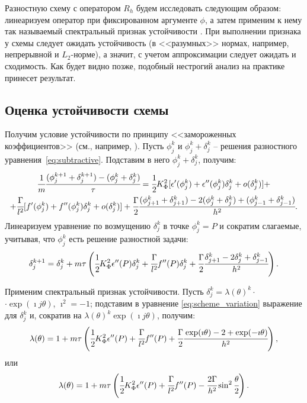 Разностную схему с оператором $R_h$ будем исследовать следующим образом: линеаризуем оператор при фиксированном аргументе $\phi$, а затем применим к нему так называемый спектральный признак устойчивости \cite{bahvalov_computational_methods}. При выполнении признака у схемы следует ожидать устойчивость (в <<разумных>> нормах, например, непрерывной и $L_2$-норме), а значит, с учетом аппроксимации следует ожидать и сходимость. Как будет видно позже, подобный нестрогий анализ на практике принесет результат.


\subsection{Оценка устойчивости схемы}

Получим условие устойчивости по принципу <<замороженных коэффициентов>> (см., например, \cite{bahvalov_computational_methods}). Пусть $\phi_j^k$ и $\phi_j^k + \delta_j^k$ -- решения разностного уравнения~\eqref{eq:subtractive}. Подставим в него $\phi_j^k + \delta_j^k$, получим:
\begin{multline*}
    \cfrac{1}{m} \cfrac{(\phi_j^{k + 1} + \delta_j^{k + 1}) - (\phi_j^k + \delta_j^k)}{\tau} = \cfrac{1}{2} K_\Phi^2 [\epsilon'(\phi_j^k) + \epsilon''(\phi_j^k) \delta_j^k + o(\delta_j^k)] + \\ + \cfrac{\Gamma}{l^2} [f'(\phi_j^k) + f''(\phi_j^k) \delta_j^k + o(\delta_j^k)] + \cfrac{\Gamma}{2} \cfrac{(\phi_{j + 1}^k + \delta_{j + 1}^k) - 2 (\phi_j^k + \delta_j^k) + (\phi_{j - 1}^k + \delta_{j - 1}^k)}{h^2} {\text{.}}
\end{multline*}
Линеаризуем уравнение по возмущению $\delta_j^k$ в точке $\phi_j^k = P$ и сократим слагаемые, учитывая, что $\phi_j^k$ есть решение разностной задачи:
\begin{equation}
    \delta_j^{k + 1} = \delta_j^k + m \tau \left( \cfrac{1}{2} K_\Phi^2 \epsilon''(P) \delta_j^k + \cfrac{\Gamma}{l^2} f''(P) \delta_j^k + \cfrac{\Gamma}{2} \cfrac{{\delta}_{j + 1}^k - 2 {\delta}_j^k + {\delta}_{j - 1}^k}{h^2} \right) {\text{.}}
    \label{eq:scheme_variation}
\end{equation} 

Применим спектральный признак устойчивости. Пусть $\delta_j^k = \lambda(\theta)^k \cdot$ \linebreak $\cdot \exp(\imath j \theta)$, $\imath^2 = -1$; подставим в уравнение \eqref{eq:scheme_variation} выражение для $\delta_j^k$ и, сократив на $\lambda(\theta)^k \exp(\imath j \theta)$, получим:
$$\lambda(\theta) = 1 + m \tau \left( \cfrac{1}{2} K_\Phi^2 \epsilon''(P) + \cfrac{\Gamma}{l^2} f''(P) + \cfrac{\Gamma}{2} \cfrac{\exp(\imath \theta) - 2 + \exp(-\imath \theta)}{h^2} \right) {\text{,}}$$
или
\begin{equation}
    \lambda(\theta) = 1 + m \tau \left( \cfrac{1}{2} K_\Phi^2 \epsilon''(P) + \cfrac{\Gamma}{l^2} f''(P) - \cfrac{2 \Gamma}{h^2} \sin^2 \cfrac{\theta}{2} \right) {\text{.}}
    \label{eq:spectral}
\end{equation}

